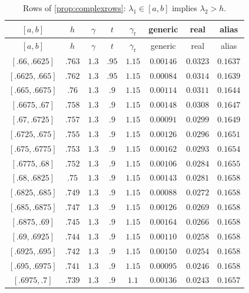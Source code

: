 \begin{center}
\scriptsize
\begin{longtable}{@{}cccccccc@{}}
\caption{Rows of \cref{prop:complexrows}: $\lambda_1\in[a,b]$ implies $\lambda_2>h$.}\label{tab:complexrows}\\
\toprule
$[a,b]$ & $h$ & $\gamma$ & $t$ & $\gamma_{\mathrm r}$ & generic & real & alias \\
\midrule
\endfirsthead
\toprule
$[a,b]$ & $h$ & $\gamma$ & $t$ & $\gamma_{\mathrm r}$ & generic & real & alias \\
\midrule
\endhead
\bottomrule
\endfoot
$[.66,.6625]$ & $.763$ & $1.3$ & $.95$ & $1.15$ & $0.00146$ & $0.0323$ & $0.1637$ \\
$[.6625,.665]$ & $.762$ & $1.3$ & $.95$ & $1.15$ & $0.00084$ & $0.0314$ & $0.1639$ \\
$[.665,.6675]$ & $.76$ & $1.3$ & $.9$ & $1.15$ & $0.00114$ & $0.0311$ & $0.1644$ \\
$[.6675,.67]$ & $.758$ & $1.3$ & $.9$ & $1.15$ & $0.00148$ & $0.0308$ & $0.1647$ \\
$[.67,.6725]$ & $.757$ & $1.3$ & $.9$ & $1.15$ & $0.00091$ & $0.0299$ & $0.1649$ \\
$[.6725,.675]$ & $.755$ & $1.3$ & $.9$ & $1.15$ & $0.00126$ & $0.0296$ & $0.1651$ \\
$[.675,.6775]$ & $.753$ & $1.3$ & $.9$ & $1.15$ & $0.00162$ & $0.0293$ & $0.1654$ \\
$[.6775,.68]$ & $.752$ & $1.3$ & $.9$ & $1.15$ & $0.00106$ & $0.0284$ & $0.1655$ \\
$[.68,.6825]$ & $.75$ & $1.3$ & $.9$ & $1.15$ & $0.00143$ & $0.0281$ & $0.1658$ \\
$[.6825,.685]$ & $.749$ & $1.3$ & $.9$ & $1.15$ & $0.00088$ & $0.0272$ & $0.1658$ \\
$[.685,.6875]$ & $.747$ & $1.3$ & $.9$ & $1.15$ & $0.00126$ & $0.0269$ & $0.1658$ \\
$[.6875,.69]$ & $.745$ & $1.3$ & $.9$ & $1.15$ & $0.00164$ & $0.0266$ & $0.1658$ \\
$[.69,.6925]$ & $.744$ & $1.3$ & $.9$ & $1.15$ & $0.00110$ & $0.0258$ & $0.1658$ \\
$[.6925,.695]$ & $.742$ & $1.3$ & $.9$ & $1.15$ & $0.00150$ & $0.0254$ & $0.1658$ \\
$[.695,.6975]$ & $.741$ & $1.3$ & $.9$ & $1.15$ & $0.00095$ & $0.0246$ & $0.1658$ \\
$[.6975,.7]$ & $.739$ & $1.3$ & $.9$ & $1.1$ & $0.00136$ & $0.0243$ & $0.1657$ \\

\end{longtable}
\end{center}
